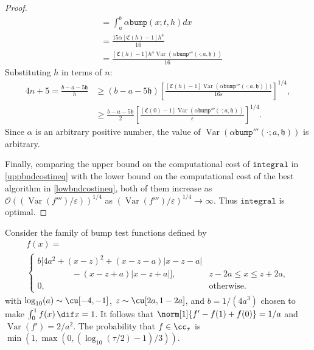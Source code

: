 \documentclass{iitthesis}
\DeclareMathOperator{\Var}{Var}
\theoremstyle{definition}
\theoremstyle{remark}
\begin{document}
\begin{proof}
\begin{subequations}
\begin{align*}
     &=\int_{a}^{b}\alpha\texttt{bump}(x;t,h)dx\\
     &=\frac{15\alpha[\mathfrak{C}(h)-1]h^4}{16}\\
     &=\frac{[\mathfrak{C}(h)-1]h^4\Var(\alpha\texttt{bump}'''(\cdot;a,\mathfrak{h}))}{16}
  \end{align*}
  \end{subequations}
  Substituting $h$  in terms of $n$:
      \begin{align*}
        4n+5=\frac{b-a-5\mathfrak{h}}{h}&\ge(b-a-5\mathfrak{h})\left[\frac{[\mathfrak{C}(h)-1]\Var(\alpha \texttt{bump}'''(\cdot;a,\mathfrak{h})))}{16\varepsilon}\right]^{1/4},\\
        &\ge\frac{b-a-5\mathfrak{h}}{2}\left[\frac{[\mathfrak{C}(0)-1]\Var(\alpha \texttt{bump}'''(\cdot;a,\mathfrak{h}))}{\varepsilon}\right]^{1/4}.
    \end{align*}
    Since $\alpha$ is an arbitrary positive number, the value of $\Var(\alpha \texttt{bump}'''(\cdot;a,\mathfrak{h}))$ is arbitrary.

    Finally, comparing the upper bound on the computational cost of $\texttt{integral}$ in \eqref{uppbndcostineq} with the lower bound on the computational cost of the best algorithm in \eqref{lowbndcostineq}, both of them increase as $\mathcal{O}((\Var(f''')/\varepsilon))^{1/4}$ as $(\Var(f''')/\varepsilon)^{1/4}\rightarrow \infty$. Thus $\texttt{integral}$ is optimal.
\end{proof}




Consider the family of bump test functions defined by
\begin{multline}\label{testfun}
f(x)= \\
\begin{cases}
\displaystyle  b[4a^2 + (x-z)^2 + (x-z-a)|x-z-a|\\
\qquad \qquad -(x-z+a)|x-z+a|], & z-2a\leq x\leq z+2a,\\[2ex]
\displaystyle  0, & \text{otherwise}.
\end{cases}
\end{multline}
with  $\log_{10}(a) \sim \cu[-4,-1]$, $z \sim \cu[2a,1-2a]$, and $b=1/(4a^3)$ chosen to make $\int_0^1 f(x) \, \dif x = 1$.  It follows that $\norm[1]{f'-f(1)+f(0)}=1/a$ and $\Var(f')=2/a^2$.  The probability that $f \in \cc_{\tau}$ is $\min\left(1,\max(0,\left(\log_{10}(\tau/2)-1\right)/3)\right).$
\end{document}
